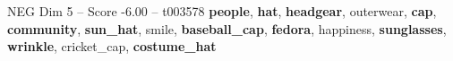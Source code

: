 \begin{textsample}{NEG Dim 5 – Score -6.00 – t003578}  \label{ex:f5_neg_017}
\textbf{people}, \textbf{hat}, \textbf{headgear}, outerwear, \textbf{cap}, \textbf{community}, \textbf{sun\_hat}, smile, \textbf{baseball\_cap}, \textbf{fedora}, happiness, \textbf{sunglasses}, \textbf{wrinkle}, cricket\_cap, \textbf{costume\_hat}

\end{textsample}

